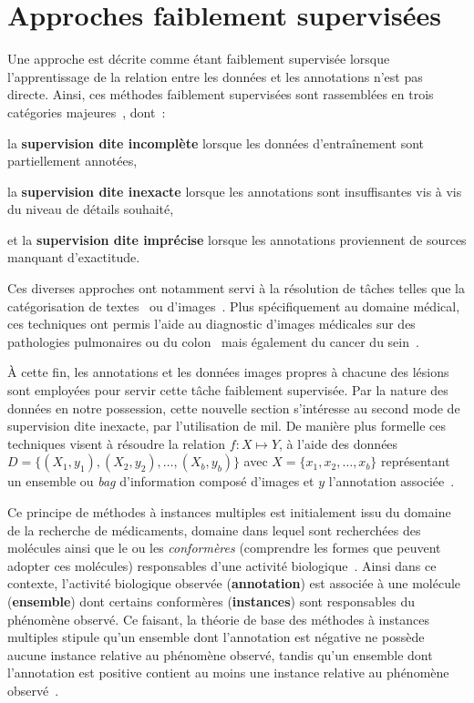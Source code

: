 \section{Approches faiblement supervisées}
\label{sec:patient_decision_weak}
Une approche est décrite comme étant faiblement supervisée lorsque l'apprentissage de la relation entre les données et les annotations n'est pas directe. Ainsi, ces méthodes faiblement supervisées sont rassemblées en trois catégories majeures~\cite{Zhou2018}, dont~:
\begin{inlinerate}
    \item la \textbf{supervision dite incomplète} lorsque les données d'entraînement sont partiellement annotées,
    \item la \textbf{supervision dite inexacte} lorsque les annotations sont insuffisantes vis à vis du niveau de détails souhaité,
    \item et la \textbf{supervision dite imprécise} lorsque les annotations proviennent de sources manquant d'exactitude.
\end{inlinerate} Ces diverses approches ont notamment servi à la résolution de tâches telles que la catégorisation de textes~\cite{Andrews2003,Settles2008} ou d'images~\cite{Chen2004,Tang2009}. Plus spécifiquement au domaine médical, ces techniques ont permis l'aide au diagnostic d'images médicales sur des pathologies pulmonaires ou du colon~\cite{Dundar2007} mais également du cancer du sein~\cite{Sudharshan2019}.\par

À cette fin, les annotations et les données images propres à chacune des lésions sont employées pour servir cette tâche faiblement supervisée. Par la nature des données en notre possession, cette nouvelle section s'intéresse au second mode de supervision dite inexacte, par l'utilisation de \gls{mil}. De manière plus formelle ces techniques visent à résoudre la relation $f: X \mapsto Y$, à l'aide des données $D=\{(X_1,y_1),(X_2,y_2),\ldots,(X_b,y_b)\}$ avec $X=\{x_1,x_2,\ldots,x_b\}$ représentant un ensemble ou \textit{bag} d'information composé d'images et $y$ l'annotation associée~\cite{foulds2010}.\par

Ce principe de méthodes à instances multiples est initialement issu du domaine de la recherche de médicaments, domaine dans lequel sont recherchées des molécules ainsi que le ou les \textit{conformères} (comprendre les formes que peuvent adopter ces molécules) responsables d'une activité biologique~\cite{Dietterich1997}. Ainsi dans ce contexte, l'activité biologique observée (\textbf{annotation}) est associée à une molécule (\textbf{ensemble}) dont certains conformères (\textbf{instances}) sont responsables du phénomène observé. Ce faisant, la théorie de base des méthodes à instances multiples stipule qu'un ensemble dont l'annotation est négative ne possède aucune instance relative au phénomène observé, tandis qu'un ensemble dont l'annotation est positive contient au moins une instance relative au phénomène observé~\cite{Dietterich1997}.\par

